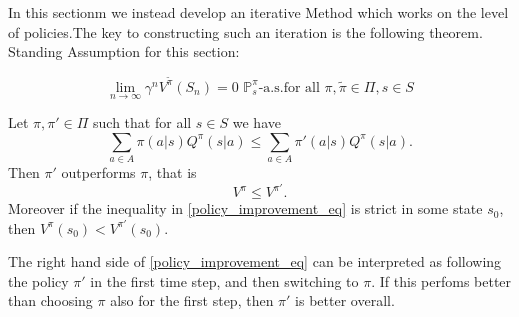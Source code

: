 In this sectionm we instead develop an iterative Method which works on the level of policies.The key to constructing such an iteration is the following theorem.
Standing Assumption for this section:

\[
    \lim_{n \to \infty} \gamma^n V^{\widetilde{\pi}}(S_n) = 0 \,\, \mathbb{P}_s^\pi \text{-a.s.} \text{for all } \pi, \widetilde{\pi} \in \Pi, s \in S
\]


\begin{theorem}
    Let \( \pi, \pi' \in \Pi \) such that for all \( s \in S \) we have
    \begin{equation}
        \sum_{a \in A} \pi(a|s) Q^\pi(s|a) \leq \sum_{a \in A} \pi'(a|s) Q^\pi(s|a). \tag{\textasteriskcentered}\label{policy_improvement_eq}
    \end{equation}
    Then \( \pi' \) outperforms \( \pi \), that is 
    \[
        V^\pi \leq V^{\pi'}.
    \]
    Moreover if the inequality in \eqref{policy_improvement_eq} is strict in some state \( s_{0} \), then \( V^\pi(s_{0}) < V^{\pi'}(s_{0}) \).
\end{theorem}

\begin{remark}
The right hand side of \eqref{policy_improvement_eq} can be interpreted as following the policy \( \pi' \) in the first time step, and then switching to \( \pi \). If this perfoms better than choosing \( \pi \) also for the first step, then \( \pi' \) is better overall.     
\end{remark}


